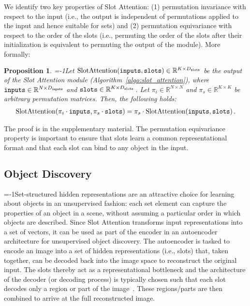 \documentclass{article}
\newtheorem{proposition}{Proposition}
\newcommand{\slots}[0]{\texttt{slots}}
\newcommand{\inp}[0]{\texttt{inputs}}
\newcommand{\sam}[0]{Slot Attention\xspace}
\begin{document}
We identify two key properties of \sam: (1) permutation invariance with respect to the input (i.e., the output is independent of permutations applied to the input and hence suitable for sets) and (2) permutation equivariance with respect to the order of the slots (i.e., permuting the order of the slots after their initialization is equivalent to permuting the output of the module). More formally:
\begin{proposition}\label{thm:layer_invarianvce_equivariance}
\looseness=-1Let $\textnormal{SlotAttention}(\textnormal{\inp}, \textnormal{\slots})\in\mathbb{R}^{K\times D_{\textnormal{\slots}}}$ be the output of the Slot Attention module (Algorithm~\ref{algo:slot_attention}), where $\textnormal{\inp}\in\mathbb{R}^{N\times D_{\textnormal{\inp}}}$ and $\textnormal{\slots}\in\mathbb{R}^{K\times D_{\textnormal{\slots}}}$\,. Let $\pi_{i}\in\mathbb{R}^{N\times N}$ and $\pi_{s}\in\mathbb{R}^{K\times K}$ be arbitrary permutation matrices. Then, the following holds:
\begin{align*}
    \textnormal{SlotAttention}(\pi_i \cdot \textnormal{\inp}, \pi_s\cdot \textnormal{\slots}) = \pi_s \cdot \textnormal{SlotAttention}(\textnormal{\inp}, \textnormal{\slots})\,.
\end{align*}
\end{proposition}

The proof is in the supplementary material. The permutation equivariance property is important to ensure that slots learn a common representational format and that each slot can bind to any object in the input.

\subsection{Object Discovery}
\label{sec:object_discovery}
\looseness=-1Set-structured hidden representations are an attractive choice for learning about objects in an unsupervised fashion: each set element can capture the properties of an object in a scene, without assuming a particular order in which objects are described. Since \sam transforms input representations into a set of vectors, it can be used as part of the encoder in an autoencoder architecture for unsupervised object discovery. The autoencoder is tasked to encode an image into a set of hidden representations (i.e., slots) that, taken together, can be decoded back into the image space to reconstruct the original input. The slots thereby act as a representational bottleneck and the architecture of the decoder (or decoding process) is typically chosen such that each slot decodes only a region or part of the image~\citep{greff2016tagger,greff2017neural,eslami2016attend,burgess2019monet,greff2019multi,engelcke2019genesis}. These regions/parts are then combined to arrive at the full reconstructed image.
\end{document}
